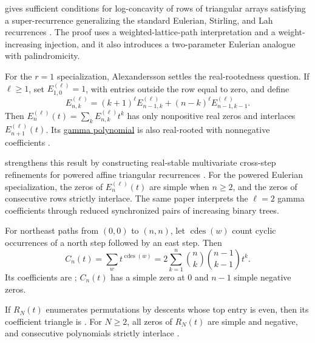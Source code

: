 \begin{example*}
 gives sufficient conditions for log-concavity of rows of
triangular arrays satisfying a super-recurrence generalizing the standard
Eulerian, Stirling, and Lah recurrences \cite{Shankar2025x}.  The proof uses a
weighted-lattice-path interpretation and a weight-increasing injection, and it
also introduces a two-parameter Eulerian analogue with palindromicity.

For the $r=1$ specialization, Alexandersson settles the real-rootedness
question.  If $\ell\geq1$, set $E^{(\ell)}_{1,0}=1$, with entries outside the
row equal to zero, and define
\[
 E^{(\ell)}_{n,k}=(k+1)^\ell E^{(\ell)}_{n-1,k}
 +(n-k)^\ell E^{(\ell)}_{n-1,k-1}.
\]
Then $E_n^{(\ell)}(t)=\sum_kE^{(\ell)}_{n,k}t^k$ has only nonpositive real
zeros and interlaces $E_{n+1}^{(\ell)}(t)$.  Its
\hyperref[gammaPolynomial]{gamma polynomial} is also real-rooted with
nonnegative coefficients \cite[Thm.~5.1]{Alexandersson2026Eulerian}.

 strengthens this result by constructing real-stable
multivariate cross-step refinements for powered affine triangular recurrences
\cite[Thms.~B--C]{Shankar2026x}.  For the powered Eulerian specialization,
the zeros of \(E_n^{(\ell)}(t)\) are simple when \(n\geq2\), and the zeros of
consecutive rows strictly interlace.  The same paper interprets the
\(\ell=2\) gamma coefficients through reduced synchronized pairs of increasing
binary trees.
\end{example*}

\begin{example*}
For northeast paths from $(0,0)$ to $(n,n)$, let $\operatorname{cdes}(w)$
count cyclic occurrences of a north step followed by an east step.  Then
\[
 C_n(t)=\sum_wt^{\operatorname{cdes}(w)}
 =2\sum_{k=1}^n\binom nk\binom{n-1}{k-1}t^k.
\]
Its coefficients are ; $C_n(t)$ has a simple zero at $0$
and $n-1$ simple negative zeros.

If $R_N(t)$ enumerates permutations by descents whose top entry is even,
then its coefficient triangle is .  For $N\geq2$, all zeros
of $R_N(t)$ are simple and negative, and consecutive polynomials strictly
interlace \cite[Thms.~3.1 and~4.1]{Alexandersson2026Eulerian}.
\end{example*}

